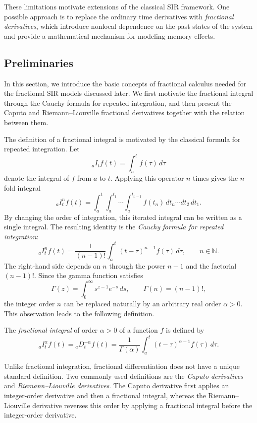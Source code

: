 \documentclass[00-main.tex]{subfiles}
\begin{document}
These limitations motivate extensions of the classical SIR framework.
One possible approach is to replace the ordinary time derivatives with \textit{fractional derivatives}, which introduce nonlocal dependence on the past states of the system and provide a mathematical mechanism for modeling memory effects.


\subsection{Preliminaries}

In this section, we introduce the basic concepts of fractional calculus needed for the fractional SIR models discussed later.
We first motivate the fractional integral through the Cauchy formula for repeated integration, and then present the Caputo and Riemann--Liouville fractional derivatives together with the relation between them.

The definition of a fractional integral is motivated by the classical formula for repeated integration. Let
\[
    {}_a I_t f(t) = \int_a^t f(\tau)\,d\tau
\]
denote the integral of $f$ from $a$ to $t$. Applying this operator $n$ times gives the $n$-fold integral
\[
    {}_a I_t^n f(t)
    = \int_a^t \int_a^{t_1} \cdots \int_a^{t_{n-1}}
      f(t_n)\,dt_n\cdots dt_2\,dt_1.
\]
By changing the order of integration, this iterated integral can be written as a single integral. The resulting identity is the \emph{Cauchy formula for repeated integration}:
\[
    {}_a I_t^n f(t)
    = \frac{1}{(n-1)!}\int_a^t (t-\tau)^{n-1}f(\tau)\,d\tau,
    \qquad n\in\mathbb{N}.
\]
The right-hand side depends on $n$ through the power $n-1$ and the factorial $(n-1)!$. Since the gamma function satisfies
\[
    \Gamma(z)=\int_0^\infty s^{z-1}e^{-s}\,ds,
    \qquad \Gamma(n)=(n-1)!,
\]
the integer order $n$ can be replaced naturally by an arbitrary real order $\alpha>0$. This observation leads to the following definition.

\begin{definition}
	The \textit{fractional integral} of order $\alpha>0$ of a function $f$ is defined by
	\[
        {}_a I_t^\alpha f(t)
        = {}_a D_t^{-\alpha}f(t)
        = \frac{1}{\Gamma(\alpha)}
          \int_a^t (t-\tau)^{\alpha-1}f(\tau)\,d\tau.
    \]
\end{definition}

Unlike fractional integration, fractional differentiation does not have a unique standard definition.
Two commonly used definitions are the \textit{Caputo derivatives} and \textit{Riemann--Liouville derivatives}.
The Caputo derivative first applies an integer-order derivative and then a fractional integral, whereas the Riemann--Liouville derivative reverses this order by applying a fractional integral before the integer-order derivative.
\end{document}

